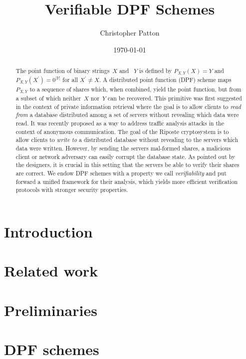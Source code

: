 \documentclass[letter]{article}
\date{\today}
\title{\textbf{Verifiable DPF Schemes}}
\author{Christopher Patton}
\begin{document}
\maketitle

\begin{abstract}
  The point function of binary strings~$X$ and~ $Y$ is defined by $P_{X,Y}(X) =
  Y$ and $P_{X,Y}(X^\prime) = 0^{|Y|}$ for all $X^\prime \ne X$. A distributed
  point function (DPF) scheme maps~$P_{X,Y}$ to a sequence of shares which, when
  combined, yield the point function, but from a subset of which neither~$X$
  nor~$Y$ can be recovered. This primitive was first suggested in the context of
  private information retrieval where the goal is to allow clients to \emph{read
  from} a database distributed among a set of servers without revealing which
  data were read. It was recently proposed as a way to address traffic analysis
  attacks in the context of anonymous communication.
  The goal of the Riposte cryptosystem \cite{riposte} is to allow clients to
  \emph{write to} a distributed database without revealing to the servers which
  data were written. However, by sending the servers mal-formed shares, a
  malicious client or network adversary can easily corrupt the database state.
  As pointed out by the designers, it is crucial in this setting that the
  servers be able to verify their shares are correct. We endow DPF schemes with
  a property we call \emph{verifiability} and put forward a unified framework
  for their analysis, which yields more efficient verification protocols with
  stronger security properties.
\end{abstract}

\section{Introduction}


\section{Related work}


\section{Preliminaries}


\section{DPF schemes}

\end{document}
